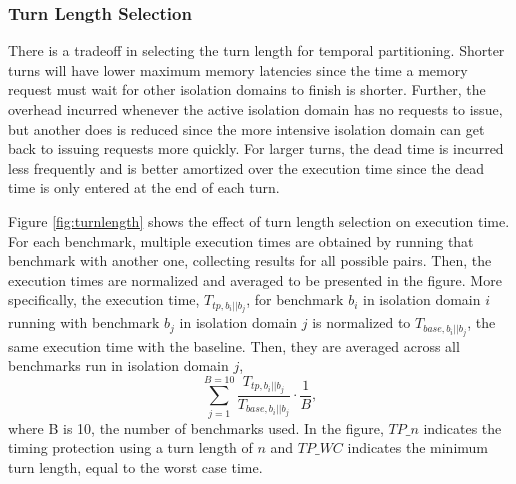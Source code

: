 \subsubsection{Turn Length Selection}
\label{sec:turnlength}
There is a tradeoff in selecting the turn length for temporal partitioning. 
Shorter turns will have lower maximum memory latencies since the time a memory 
request must wait for other isolation domains to finish is shorter. Further, 
the overhead incurred whenever the active isolation domain has no requests to 
issue, but another does is reduced since the more intensive isolation domain 
can get back to issuing requests more quickly. For 
larger turns, the dead time is incurred less frequently and is better amortized 
over the execution time since the dead time is only entered at the end of each 
turn.

Figure \ref{fig:turnlength} shows the effect of turn length selection on 
execution time. For each benchmark, multiple execution times are obtained by
running that benchmark with another one, collecting results for all possible pairs.
Then, the execution times are normalized and averaged to be presented in the figure.
More specifically, the execution time, 
$T_{tp,b_{i}||b_{j}}$, for benchmark $b_i$ in isolation domain $i$ running 
with benchmark $b_{j}$ in isolation domain $j$ is normalized to 
$T_{base,b_{i}||b_{j}}$, the same execution time with the baseline. Then, 
they are averaged across all benchmarks run in isolation domain $j$,
\begin{equation}
    \label{eq:latavg}
    \sum_{j=1}^{B=10}\frac{T_{tp,b_{i}||b_{j}}}{T_{base,b_{i}||b_{j}}}\cdot\frac{1}{B},
\end{equation}
where B is 10, the number of benchmarks used. 
In the figure, $TP\_n$ 
indicates the timing protection using a turn length of 
$n$ and $TP\_WC$ indicates the minimum turn length, equal to the worst case 
time.

\begin{figure*}
    \begin{center}
        \vspace{-0.10in}
        \caption{Effect of Turn Length on excution Time.}
        \label{fig:turnlength}
    \end{center}
\end{figure*}

